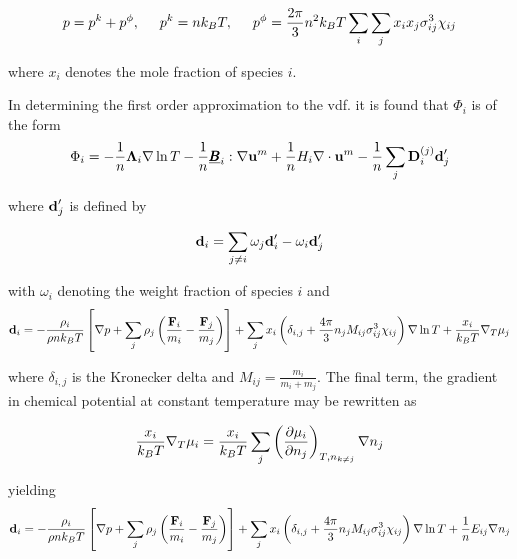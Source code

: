 \begin{equation}
    p = p^k + p^\phi, \hspace{.5cm} p^k = n k_B T, \hspace{.5cm} p^\phi = \frac{2 \pi}{3} n^2 k_B T \sum_i \sum_j x_i x_j \sigma_{ij}^3 \chi_{ij}
\end{equation}

where $x_i$ denotes the mole fraction of species $i$.

In determining the first order approximation to the vdf. it is found that $\Phi_i$ is of the form
\begin{equation}
    \Phi_i = - \frac{1}{n} \boldsymbol{\mathrm{\Lambda}}_i \nabla \ln T - \frac{1}{n} \underline{\pmb{B}}_i : \nabla \boldsymbol{\mathrm{u}}^m + \frac{1}{n} H_i \nabla \cdot \boldsymbol{\mathrm{u}}^m - \frac{1}{n} \sum_j \boldsymbol{\mathrm{D}}_i^{(j)} \boldsymbol{\mathrm{d}}_j'
\end{equation}

where $\boldsymbol{\mathrm{d}}_j'$ is defined by

\begin{equation}
    \boldsymbol{\mathrm{d}}_i = \sum_{j \neq i} \omega_j \boldsymbol{\mathrm{d}}_i' - \omega_i \boldsymbol{\mathrm{d}}_j'
\end{equation}

with $\omega_i$ denoting the weight fraction of species $i$ and
\begin{equation}
    \boldsymbol{\mathrm{d}}_i = - \frac{\rho_i}{\rho n k_B T} \left[ \nabla p + \sum_j \rho_j \left( \frac{\boldsymbol{\mathrm{F}}_i}{m_i} - \frac{\boldsymbol{\mathrm{F}}_j}{m_j}\right) \right] + \sum_j x_i \left( \delta_{i,j} + \frac{4 \pi}{3} n_j M_{ij} \sigma_{ij}^3 \chi_{ij}\right) \nabla \ln T + \frac{x_i}{k_B T} \nabla_T \mu_j
    \label{eq:diffusion_driving_force}
\end{equation}

where $\delta_{i,j}$ is the Kronecker delta and $M_{ij} = \frac{m_i}{m_i + m_j}$. The final term, the gradient in chemical potential at constant temperature may be rewritten as

\begin{equation}
    \frac{x_i}{k_B T} \nabla_T \mu_i = \frac{x_i}{k_B T} \sum_j \left(\frac{\partial \mu_i}{\partial n_j}\right)_{T,n_{k \neq j}} \nabla n_j
\end{equation}

yielding
\begin{equation}
    \boldsymbol{\mathrm{d}}_i = - \frac{\rho_i}{\rho n k_B T} \left[ \nabla p + \sum_j \rho_j \left( \frac{\boldsymbol{\mathrm{F}}_i}{m_i} - \frac{\boldsymbol{\mathrm{F}}_j}{m_j}\right) \right] + \sum_j x_i \left( \delta_{i,j} + \frac{4 \pi}{3} n_j M_{ij} \sigma_{ij}^3
    \chi_{ij}\right) \nabla \ln T + \frac{1}{n} E_{ij} \nabla n_j
    \label{eq:diffusion_driving_force2}
\end{equation}

